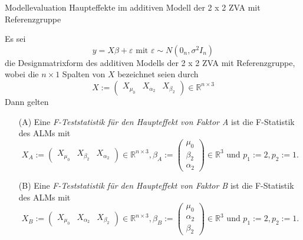 \documentclass[
  8pt,
  ignorenonframetext,
]{beamer}
\begin{document}
\begin{frame}{\small Modellevaluation \textbar{} Haupteffekte im
additiven Modell der 2 x 2 ZVA mit Referenzgruppe}
\protect\hypertarget{modellevaluation-haupteffekte-im-additiven-modell-der-2-x-2-zva-mit-referenzgruppe}{}
\vspace{1mm}
\footnotesize
\begin{theorem}
\justifying
\normalfont
Es sei
\begin{equation}
y = X\beta + \varepsilon \mbox{ mit } \varepsilon \sim N(0_n,\sigma^2I_n)
\end{equation}
die Designmatrixform des additiven Modells der 2 x 2 ZVA mit Referenzgruppe, wobei die $n \times 1$ Spalten von $X$ bezeichnet
seien durch
\begin{equation}
X := \begin{pmatrix} X_{\mu_0} & X_{\alpha_2} & X_{\beta_2} \end{pmatrix} \in \mathbb{R}^{n \times 3}
\end{equation}
Dann gelten
\begin{itemize}
\item[(A)] Eine \textit{F-Teststatistik für den Haupteffekt von Faktor A} ist die F-Statistik
des ALMs mit
\begin{equation}
X_A     := \begin{pmatrix} X_{\mu_0} &   X_{\beta_2} & X_{\alpha_2} \end{pmatrix} \in \mathbb{R}^{n \times 3},
\beta_A := \begin{pmatrix} \mu_0 \\ \beta_2 \\ \alpha_2 \end{pmatrix} \in \mathbb{R}^3
\mbox{ und } p_1 := 2, p_2 := 1.
\end{equation}
\item[(B)] Eine \textit{F-Teststatistik für den Haupteffekt von Faktor B} ist die F-Statistik des ALMs mit
\begin{equation}
X_B    := \begin{pmatrix} X_{\mu_0} & X_{\alpha_2} & X_{\beta_2} \end{pmatrix} \in \mathbb{R}^{n \times 3},
\beta_B := \begin{pmatrix} \mu_0 \\ \alpha_2 \\ \beta_2 \end{pmatrix} \in \mathbb{R}^3
\mbox{ und } p_1 := 2, p_2 := 1.
\end{equation}
\end{itemize}
\end{theorem}
\end{frame}
\end{document}
